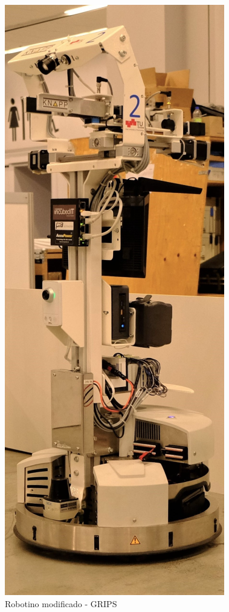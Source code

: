 \begin{figure}[H]
    \centering
    \includegraphics[scale=0.25]{Figures/RobotinoGRIPS_Old.png}
        \caption{Robotino modificado - GRIPS \cite{furbaß_robocup_2021}}
        \label{fig:Robotino_GRIPS}
\end{figure}

